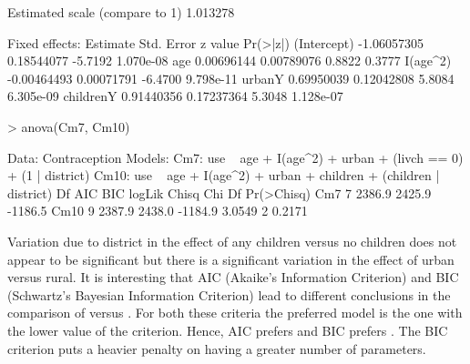 \documentclass[12pt]{article}
\begin{document}
\begin{Schunk}
\begin{Soutput}
Estimated scale (compare to 1)  1.013278 

Fixed effects:
               Estimate  Std. Error z value  Pr(>|z|)
(Intercept) -1.06057305  0.18544077 -5.7192 1.070e-08
age          0.00696144  0.00789076  0.8822    0.3777
I(age^2)    -0.00464493  0.00071791 -6.4700 9.798e-11
urbanY       0.69950039  0.12042808  5.8084 6.305e-09
childrenY    0.91440356  0.17237364  5.3048 1.128e-07
\end{Soutput}
\begin{Sinput}
> anova(Cm7, Cm10)
\end{Sinput}
\begin{Soutput}
Data: Contraception
Models:
Cm7: use ~ age + I(age^2) + urban + (livch == 0) + (1 | district)
Cm10: use ~ age + I(age^2) + urban + children + (children | district)
     Df     AIC     BIC  logLik  Chisq Chi Df Pr(>Chisq)
Cm7   7  2386.9  2425.9 -1186.5                         
Cm10  9  2387.9  2438.0 -1184.9 3.0549      2     0.2171
\end{Soutput}
\end{Schunk}

Variation due to district in the effect of any children versus no
children does not appear to be significant but there is a significant
variation in the effect of urban versus rural.  It is interesting that
AIC (Akaike's Information Criterion) and BIC (Schwartz's Bayesian
Information Criterion) lead to different conclusions in the comparison
of  versus .  For both these criteria the
preferred model is the one with the lower value of the criterion.
Hence, AIC prefers  and BIC prefers .  The BIC
criterion puts a heavier penalty on having a greater number of parameters.
\end{document}
